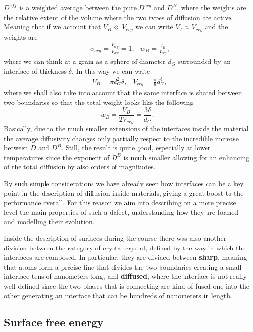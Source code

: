 {
    $D^{eff}$ is a weighted average between the pure $D^{cry}$ and $D^B$, where the weights are the relative extent of the volume where the two types of diffusion are active. Meaning that if we account that $V_B \ll V_{cry}$ we can write $V_T \approx V_{cry}$ and the weights are
    \begin{align}
        &w_{cry} = \frac{V_{cry}}{V_{cry}} = 1, &w_B = \frac{V_B}{V_{cry}},
    \end{align}
    where we can think at a grain as a sphere of diameter $d_G$ surrounded by an interface of thickness $\delta$. In this way we can write
    \begin{align}
        &V_B = \pi d_G^2 \delta, &V_{cry} = \frac{\pi}{6}d_G^3,
    \end{align}
    where we shall also take into account that the same interface is shared between two boundaries so that the total weight looks like the following
    \begin{equation}
        w_B = \frac{V_B}{2V_{cry}} = \frac{3\delta}{d_G}.
    \end{equation}
}
\noindent
Basically, due to the much smaller extensions of the interfaces inside the material the average diffusivity changes only partially respect to the incredible increase between $D$ and $D^B$. Still, the result is quite good, especially at lower temperatures since the exponent of $D^B$ is much smaller allowing for an enhancing of the total diffusion by also orders of magnitudes.

By such simple considerations we have already seen how interfaces can be a key point in the description of diffusion inside materials, giving a great boost to the performance overall. For this reason we aim into describing on a more precise level the main properties of such a defect, understanding how they are formed and modelling their evolution.

\nt
{
    Inside the description of surfaces during the course there was also another division between the category of crystal-crystal, defined by the way in which the interfaces are composed. In particular, they are divided between \textbf{sharp}, meaning that atoms form a precise line that divides the two boundaries creating a small interface tens of nanometers long, and \textbf{diffused}, where the interface is not really well-defined since the two phases that is connecting are kind of fused one into the other generating an interface that can be hundreds of nanometers in length.
}

\subsection{Surface free energy}